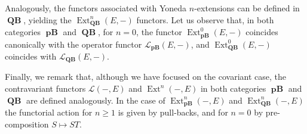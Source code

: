 \documentclass[12pt,a4paper]{amsproc}
\theoremstyle{remark}
\theoremstyle{definition}
\newcommand{\QBan}{\operatorname{\textbf{QB}}}
\newcommand{\pBan}{\operatorname{\textbf{pB}}}
\numberwithin{equation}{section}
\begin{document}
\par Analogously, the functors associated with Yoneda $n$-extensions can be defined in $\boldsymbol{\QBan}$, yielding the $\operatorname{Ext}^n_{\boldsymbol{\QBan}}(E,-)$ functors. Let us observe that, in both categories $\boldsymbol{\pBan}$ and $\boldsymbol{\QBan}$, for $n=0$, the functor $\operatorname{Ext}^0_{\boldsymbol{\pBan}}(E,-)$ coincides canonically with the operator functor $\mathcal{L}_{\boldsymbol{\pBan}}(E,-)$, and $\operatorname{Ext}^0_{\boldsymbol{\QBan}}(E,-)$ coincides with $\mathcal{L}_{\boldsymbol{\QBan}}(E,-)$.

\par Finally, we remark that, although we have focused on the covariant case, the contravariant functors $\mathcal{L}(-,E)$ and $\operatorname{Ext}^n(-,E)$ in both categories $\boldsymbol{\pBan}$ and $\boldsymbol{\QBan}$ are defined analogously. In the case of $\operatorname{Ext}^n_{\pBan}(-,E)$ and $\operatorname{Ext}^n_{\QBan}(-,E)$ the functorial action for $n \ge 1$ is given by pull-backs, and for $n=0$ by pre-composition $S \mapsto ST$.
	
	
\end{document}
